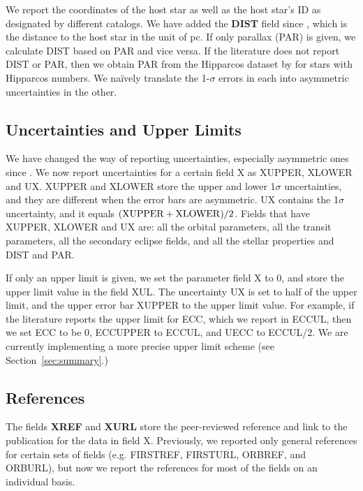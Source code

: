\documentclass[11pt,preprint]{aastex}
\begin{document}
\begin{CJK*}{UTF8}{gbsn}
We report the coordinates of the host star as well as the host star's
ID as designated by different catalogs.  We have added the {\bf DIST} field since
\cite{Wright2011}, which is the distance to the host star in the unit
of pc. If only parallax (PAR) is given, we calculate DIST based on PAR
and vice versa. If the literature does not report DIST or PAR, then we
obtain PAR from the Hipparcos dataset by \cite{van Leeuwen2009} for
stars with Hipparcos numbers. We na\"ively translate the 1-$\sigma$ errors in each into asymmetric
uncertainties in the other.

\subsection{Uncertainties and Upper Limits}\label{sec:unc}

We have changed the way of reporting uncertainties, especially
asymmetric ones since \cite{Wright2011}. We now report
uncertainties for a certain field X as XUPPER, XLOWER and UX. XUPPER
and XLOWER store the upper and lower 1$\sigma$ uncertainties, and they
are different when the error bars are asymmetric. UX contains the
1$\sigma$ uncertainty, and it equals $({\rm XUPPER+XLOWER})/2$. Fields
that have XUPPER, XLOWER and UX are: all the orbital parameters, all
the transit parameters, all the secondary eclipse fields, and all the stellar
properties and DIST and PAR.

If only an upper limit is given, we set the parameter field X to 0,
and store the upper limit value in the field XUL. The uncertainty UX
is set to half of the upper limit, and the upper error bar XUPPER to
the upper limit value. For example, if the literature reports the
upper limit for ECC, which we report in ECCUL, then we set ECC to be
0, ECCUPPER to ECCUL, and UECC to ECCUL/2.  We are currently
implementing a more precise upper limit scheme (see
Section~\ref{sec:summary}.)


\subsection{References}\label{sec:ref}

The fields {\bf XREF} and {\bf XURL} store the peer-reviewed reference
and link to the publication for the data in field X. Previously, we 
reported only general references for certain sets of fields (e.g. FIRSTREF,
FIRSTURL, ORBREF, and ORBURL), but now we report the references for
most of the fields on an individual basis.


\end{CJK*}
\end{document}
